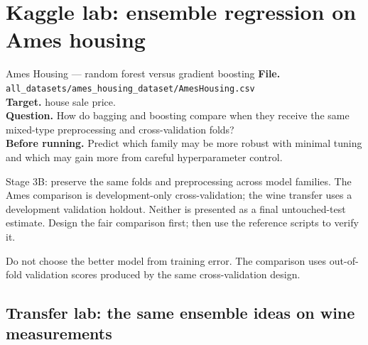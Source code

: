 \section{Kaggle lab: ensemble regression on Ames housing}
\label{sec:kaggle-house-prices-ensembles}

\begin{kaggleproject}{Ames Housing --- random forest versus gradient boosting}
\textbf{File.} \texttt{all\_datasets/ames\_housing\_dataset/AmesHousing.csv}\\
\textbf{Target.} house sale price.\\
\textbf{Question.} How do bagging and boosting compare when they receive the same mixed-type preprocessing and cross-validation folds?\\
\textbf{Before running.} Predict which family may be more robust with minimal tuning and which may gain more from careful hyperparameter control.

\begin{labmode}
Stage 3B: preserve the same folds and preprocessing across model families. The Ames comparison is development-only cross-validation; the wine transfer uses a development validation holdout. Neither is presented as a final untouched-test estimate. Design the fair comparison first; then use the reference scripts to verify it.
\end{labmode}



\begin{pitfall}
Do not choose the better model from training error. The comparison uses out-of-fold validation scores produced by the same cross-validation design.
\end{pitfall}
\end{kaggleproject}

\subsection{Transfer lab: the same ensemble ideas on wine measurements}

